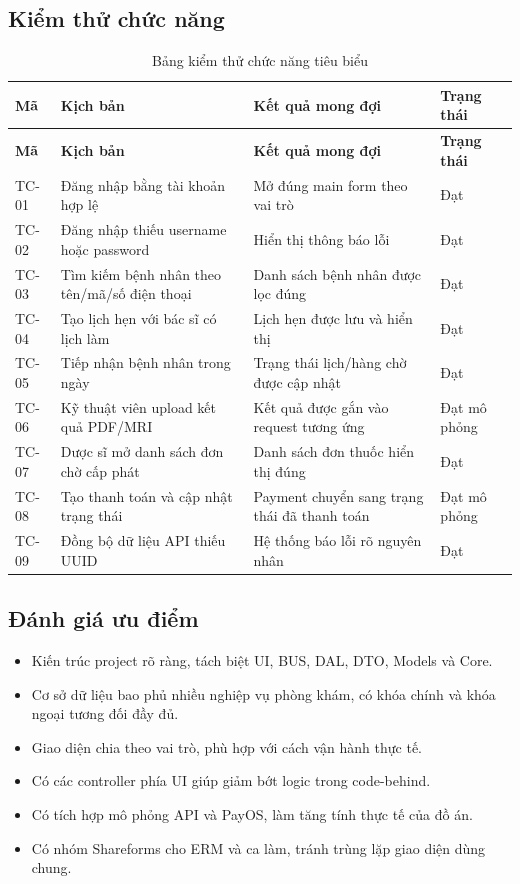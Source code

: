 \documentclass[12pt,a4paper]{article}
\numberwithin{figure}{subsection}
\numberwithin{table}{subsection}
\begin{document}
\subsection{Kiểm thử chức năng}

\begin{longtable}{|p{2cm}|p{4.6cm}|p{4.1cm}|p{3.2cm}|}
\caption{Bảng kiểm thử chức năng tiêu biểu} \\
\hline
\textbf{Mã} & \textbf{Kịch bản} & \textbf{Kết quả mong đợi} & \textbf{Trạng thái} \\
\hline
\endfirsthead
\hline
\textbf{Mã} & \textbf{Kịch bản} & \textbf{Kết quả mong đợi} & \textbf{Trạng thái} \\
\hline
\endhead
TC-01 & Đăng nhập bằng tài khoản hợp lệ & Mở đúng main form theo vai trò & Đạt \\
\hline
TC-02 & Đăng nhập thiếu username hoặc password & Hiển thị thông báo lỗi & Đạt \\
\hline
TC-03 & Tìm kiếm bệnh nhân theo tên/mã/số điện thoại & Danh sách bệnh nhân được lọc đúng & Đạt \\
\hline
TC-04 & Tạo lịch hẹn với bác sĩ có lịch làm & Lịch hẹn được lưu và hiển thị & Đạt \\
\hline
TC-05 & Tiếp nhận bệnh nhân trong ngày & Trạng thái lịch/hàng chờ được cập nhật & Đạt \\
\hline
TC-06 & Kỹ thuật viên upload kết quả PDF/MRI & Kết quả được gắn vào request tương ứng & Đạt mô phỏng \\
\hline
TC-07 & Dược sĩ mở danh sách đơn chờ cấp phát & Danh sách đơn thuốc hiển thị đúng & Đạt \\
\hline
TC-08 & Tạo thanh toán và cập nhật trạng thái & Payment chuyển sang trạng thái đã thanh toán & Đạt mô phỏng \\
\hline
TC-09 & Đồng bộ dữ liệu API thiếu UUID & Hệ thống báo lỗi rõ nguyên nhân & Đạt \\
\hline
\end{longtable}

\subsection{Đánh giá ưu điểm}

\begin{itemize}
    \item Kiến trúc project rõ ràng, tách biệt UI, BUS, DAL, DTO, Models và Core.
    \item Cơ sở dữ liệu bao phủ nhiều nghiệp vụ phòng khám, có khóa chính và khóa ngoại tương đối đầy đủ.
    \item Giao diện chia theo vai trò, phù hợp với cách vận hành thực tế.
    \item Có các controller phía UI giúp giảm bớt logic trong code-behind.
    \item Có tích hợp mô phỏng API và PayOS, làm tăng tính thực tế của đồ án.
    \item Có nhóm Shareforms cho ERM và ca làm, tránh trùng lặp giao diện dùng chung.
\end{itemize}
\end{document}
